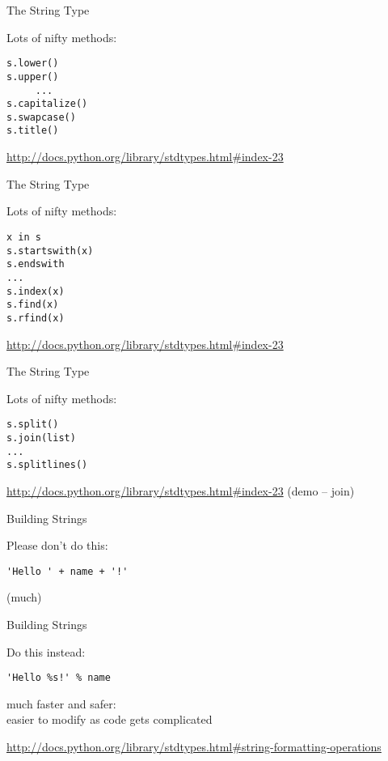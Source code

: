 \documentclass{beamer}
\begin{document}
\begin{frame}[fragile]{The String Type}

{\Large Lots of nifty methods:}

\begin{verbatim}
s.lower()
s.upper()
     ...
s.capitalize()
s.swapcase()
s.title()
\end{verbatim}

\url{http://docs.python.org/library/stdtypes.html#index-23}

\end{frame} 

\begin{frame}[fragile]{The String Type}

{\Large Lots of nifty methods:}

\begin{verbatim}
x in s
s.startswith(x)
s.endswith
...
s.index(x)
s.find(x)
s.rfind(x)
\end{verbatim}

\url{http://docs.python.org/library/stdtypes.html#index-23}

\end{frame} 

\begin{frame}[fragile]{The String Type}

{\Large Lots of nifty methods:}

\begin{verbatim}
s.split()
s.join(list)
...
s.splitlines()
\end{verbatim}

\url{http://docs.python.org/library/stdtypes.html#index-23}
\vfill
(demo -- join)

\end{frame} 

\begin{frame}[fragile]{Building Strings}

{\Large Please don't do this:

\vfill
\begin{verbatim}
'Hello ' + name + '!'
\end{verbatim}
}
\vfill
(much)

\end{frame} 

\begin{frame}[fragile]{Building Strings}

{\Large Do this instead:

\vfill
\begin{verbatim}
'Hello %s!' % name
\end{verbatim}

\vfill
much faster and safer: \\
easier to modify as code gets complicated
}
\url{http://docs.python.org/library/stdtypes.html#string-formatting-operations}
\end{frame} 
\end{document}
